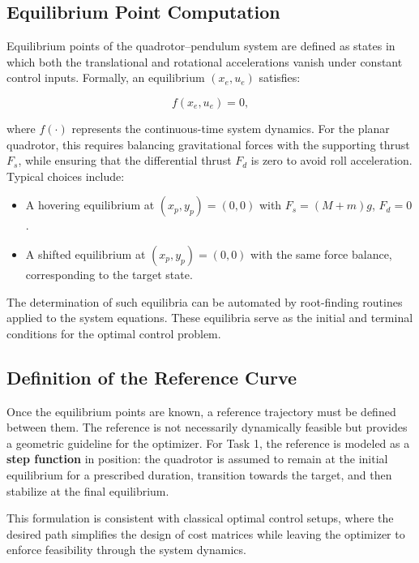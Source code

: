 \documentclass[a4paper,11pt,oneside]{book}
\begin{document}
\subsection{Equilibrium Point Computation}
Equilibrium points of the quadrotor–pendulum system are defined as states in which both the translational and rotational accelerations vanish under constant control inputs. Formally, an equilibrium $(x_e, u_e)$ satisfies:

\begin{equation}
    f(x_e, u_e) = 0,
\end{equation}

where $f(\cdot)$ represents the continuous-time system dynamics. For the planar quadrotor, this requires balancing gravitational forces with the supporting thrust $F_s$, while ensuring that the differential thrust $F_d$ is zero to avoid roll acceleration. Typical choices include:

\begin{itemize}
    \item A hovering equilibrium at $(x_p, y_p) = (0,0) $ with $F_s = (M + m)g$, $F_d = 0$.
    \item A shifted equilibrium at $(x_p, y_p) = (0,0) $ with the same force balance, corresponding to the target state.
\end{itemize}

The determination of such equilibria can be automated by root-finding routines applied to the system equations. These equilibria serve as the initial and terminal conditions for the optimal control problem.

\subsection{Definition of the Reference Curve}

Once the equilibrium points are known, a reference trajectory must be defined between them. The reference is not necessarily dynamically feasible but provides a geometric guideline for the optimizer. For Task 1, the reference is modeled as a \textbf{step function} in position: the quadrotor is assumed to remain at the initial equilibrium for a prescribed duration, transition towards the target, and then stabilize at the final equilibrium.

This formulation is consistent with classical optimal control setups, where the desired path simplifies the design of cost matrices while leaving the optimizer to enforce feasibility through the system dynamics.
\end{document}
